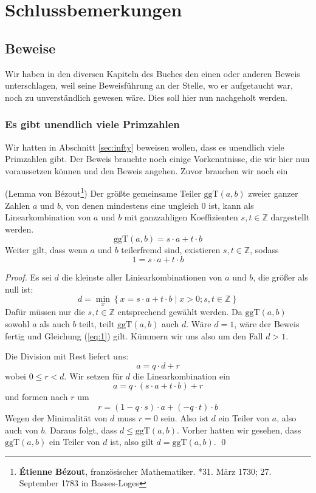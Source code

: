 
\chapter{Schlussbemerkungen}

\section{Beweise}

Wir haben in den diversen Kapiteln des Buches den einen oder anderen Beweis unterschlagen, weil seine Beweisführung an der Stelle, wo er aufgetaucht war, noch zu unverständlich gewesen wäre. Dies soll hier nun nachgeholt werden.


\subsection{Es gibt unendlich viele Primzahlen}\label{chap:proofprime}
Wir hatten in Abschnitt \ref{sec:infty} beweisen wollen, dass es unendlich viele Primzahlen gibt. Der Beweis brauchte noch einige Vorkenntnisse, die wir hier nun voraussetzen können und den Beweis angehen. Zuvor brauchen wir noch ein

\begin{lemma}{(Lemma von Bézout\footnote{\textbf{Étienne Bézout}, französischer Mathematiker. *31. März 1730; 27. September 1783 in Basses-Loges})}
Der größte gemeinsame Teiler $\text{ggT}(a,b) $ zweier ganzer Zahlen $a$ und $b$, von denen mindestens eine ungleich 0 ist, kann als Linearkombination von $a$ und $b$ mit ganzzahligen Koeffizienten $s,t\in \mathbb{Z}$ dargestellt werden. 
\[
\text{ggT}(a,b) = s\cdot a+t\cdot b
\]
Weiter gilt, dass wenn $a$ und $b$ teilerfremd sind, existieren $s,t \in \mathbb{Z}$, sodass
\begin{equation}\label{eq:1}
1 = s\cdot a+t\cdot b
\end{equation}
\end{lemma}
\begin{proof}
Es sei $d$ die kleinste aller Liniearkombinationen von $a$ und $b$, die größer als null ist:
\[
d = \min_x \left\lbrace x = s\cdot a+t\cdot b \mid x>0; s,t\in \mathbb{Z} \right\rbrace
\]
Dafür müssen nur die $s,t\in \mathbb{Z}$ entsprechend gewählt werden. Da $\text{ggT}(a,b)$ sowohl $a$ als auch $b$ teilt, teilt $\text{ggT}(a,b)$ auch $d$. Wäre $d=1$, wäre der Beweis fertig und Gleichung (\ref{eq:1}) gilt. Kümmern wir uns also um den Fall $d>1$. 

Die Division mit Rest liefert uns:
\[
a = q\cdot d+r
\]
wobei $0\le r < d$. Wir setzen für $d$ die Linearkombination ein
\[
a = q\cdot(s\cdot a+t\cdot b)+r
\]
und formen nach $r$ um
\[
r = (1-q\cdot s)\cdot a+(-q\cdot t)\cdot b
\]
Wegen der Minimalität von $d$ muss $r=0$ sein. Also ist $d$ ein Teiler von $a$, also auch von $b$. Daraus folgt, dass $d\le \text{ggT}(a,b)$. Vorher hatten wir gesehen, dass $\text{ggT}(a,b)$ ein Teiler von $d$ ist, also gilt $d=\text{ggT}(a,b)$.
\qed
\end{proof}

